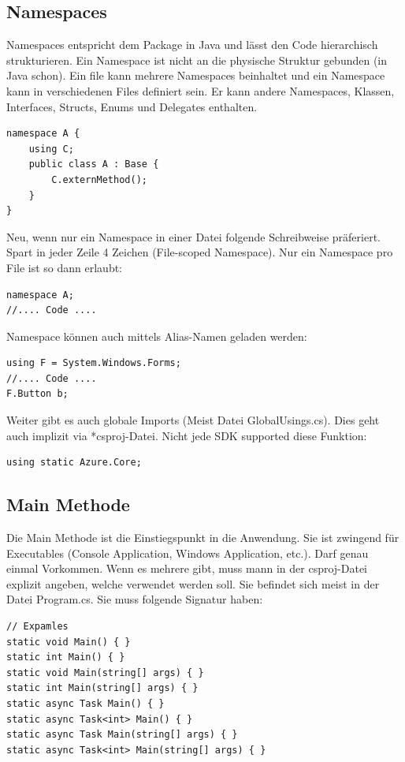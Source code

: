\documentclass[
a4paper,
oneside,
10pt,
fleqn,
headsepline,
toc=listofnumbered, 
bibliography=totocnumbered]{scrartcl}
\begin{document}
\pagebreak
\subsection{Namespaces}
Namespaces entspricht dem Package in Java und lässt den Code hierarchisch strukturieren. Ein Namespace ist nicht an die physische Struktur gebunden (in Java schon). Ein file kann mehrere Namespaces beinhaltet und ein Namespace kann in verschiedenen Files definiert sein. Er kann andere Namespaces, Klassen, Interfaces, Structs, Enums und Delegates enthalten.
\begin{lstlisting}
namespace A {
	using C;
	public class A : Base {
		C.externMethod();
	}
}
\end{lstlisting}

Neu, wenn nur ein Namespace in einer Datei folgende Schreibweise präferiert. Spart in jeder Zeile 4 Zeichen (File-scoped Namespace). Nur ein Namespace pro File ist so dann erlaubt:
\begin{lstlisting}
namespace A;
//.... Code ....
\end{lstlisting}

Namespace können auch mittels Alias-Namen geladen werden:
\begin{lstlisting}
using F = System.Windows.Forms;
//.... Code ....
F.Button b;
\end{lstlisting}

Weiter gibt es auch globale Imports (Meist Datei GlobalUsings.cs). Dies geht auch implizit via *csproj-Datei. Nicht jede SDK supported diese Funktion:
\begin{lstlisting}
using static Azure.Core;
\end{lstlisting}

\subsection{Main Methode}
Die Main Methode ist die Einstiegspunkt in die Anwendung. Sie ist zwingend für Executables (Console Application, Windows Application, etc.). Darf genau einmal Vorkommen. Wenn es mehrere gibt, muss mann in der csproj-Datei explizit angeben, welche verwendet werden soll. Sie befindet sich meist in der Datei Program.cs. Sie muss folgende Signatur haben:
\begin{lstlisting}
// Expamles
static void Main() { }
static int Main() { }
static void Main(string[] args) { }
static int Main(string[] args) { }
static async Task Main() { }
static async Task<int> Main() { }
static async Task Main(string[] args) { }
static async Task<int> Main(string[] args) { }
\end{lstlisting}
\end{document}
